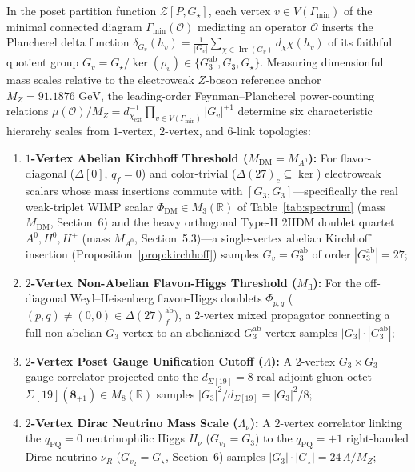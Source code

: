 \documentclass[11pt,a4paper]{article}
\theoremstyle{definition}
\theoremstyle{remark}
\newcommand{\R}{\mathbb{R}}
\newcommand{\Irr}{\operatorname{Irr}}
\newcommand{\Gthree}{G_3}
\newcommand{\Gstar}{G_\star}
\begin{document}
In the poset partition function $\mathcal{Z}[P, \Gstar]$, each vertex $v \in V(\Gamma_{\min})$ of the minimal connected diagram $\Gamma_{\min}(\mathcal{O})$ mediating an operator $\mathcal{O}$ inserts the Plancherel delta function $\delta_{G_v}(h_v) = \frac{1}{|G_v|}\sum_{\chi \in \Irr(G_v)} d_\chi \chi(h_v)$ of its faithful quotient group $G_v = \Gstar / \ker(\rho_v) \in \{\Gthree^{\mathrm{ab}}, \Gthree, \Gstar\}$. Measuring dimensionful mass scales relative to the electroweak $Z$-boson reference anchor $M_Z = 91.1876\text{ GeV}$, the leading-order Feynman--Plancherel power-counting relations $\mu(\mathcal{O})/M_Z = d_{\chi_{\mathrm{ext}}}^{-1} \prod_{v \in V(\Gamma_{\min})} |G_v|^{\pm 1}$ determine six characteristic hierarchy scales from $1$-vertex, $2$-vertex, and $6$-link topologies:
\begin{enumerate}
    \item \textbf{$1$-Vertex Abelian Kirchhoff Threshold ($M_{\mathrm{DM}} = M_{A^0}$):} For flavor-diagonal ($\Delta[0]$, $q_f = 0$) and color-trivial ($\Delta(27)_c \subseteq \ker$) electroweak scalars whose mass insertions commute with $[\Gthree, \Gthree]$---specifically the real weak-triplet WIMP scalar $\Phi_{\mathrm{DM}} \in M_3(\R)$ of Table~\ref{tab:spectrum} (mass $M_{\mathrm{DM}}$, Section~6) and the heavy orthogonal Type-II 2HDM doublet quartet $A^0, H^0, H^\pm$ (mass $M_{A^0}$, Section~5.3)---a single-vertex abelian Kirchhoff insertion (Proposition~\ref{prop:kirchhoff}) samples $G_v = \Gthree^{\mathrm{ab}}$ of order $|\Gthree^{\mathrm{ab}}| = 27$;
    \item \textbf{$2$-Vertex Non-Abelian Flavon-Higgs Threshold ($M_{\mathrm{fl}}$):} For the off-diagonal Weyl--Heisenberg flavon-Higgs doublets $\Phi_{p,q}$ ($(p,q) \neq (0,0) \in \Delta(27)_f^{\mathrm{ab}}$), a $2$-vertex mixed propagator connecting a full non-abelian $\Gthree$ vertex to an abelianized $\Gthree^{\mathrm{ab}}$ vertex samples $|\Gthree| \cdot |\Gthree^{\mathrm{ab}}|$;
    \item \textbf{$2$-Vertex Poset Gauge Unification Cutoff ($\Lambda$):} A $2$-vertex $\Gthree \times \Gthree$ gauge correlator projected onto the $d_{\Sigma[19]} = 8$ real adjoint gluon octet $\Sigma[19](\mathbf{8}_{+1}) \in M_8(\R)$ samples $|\Gthree|^2 / d_{\Sigma[19]} = |\Gthree|^2 / 8$;
    \item \textbf{$2$-Vertex Dirac Neutrino Mass Scale ($\Lambda_\nu$):} A $2$-vertex correlator linking the $q_{\mathrm{PQ}} = 0$ neutrinophilic Higgs $H_\nu$ ($G_{v_1} = \Gthree$) to the $q_{\mathrm{PQ}} = +1$ right-handed Dirac neutrino $\nu_R$ ($G_{v_2} = \Gstar$, Section~6) samples $|\Gthree| \cdot |\Gstar| = 24\,\Lambda / M_Z$;

\end{enumerate}
\end{document}
